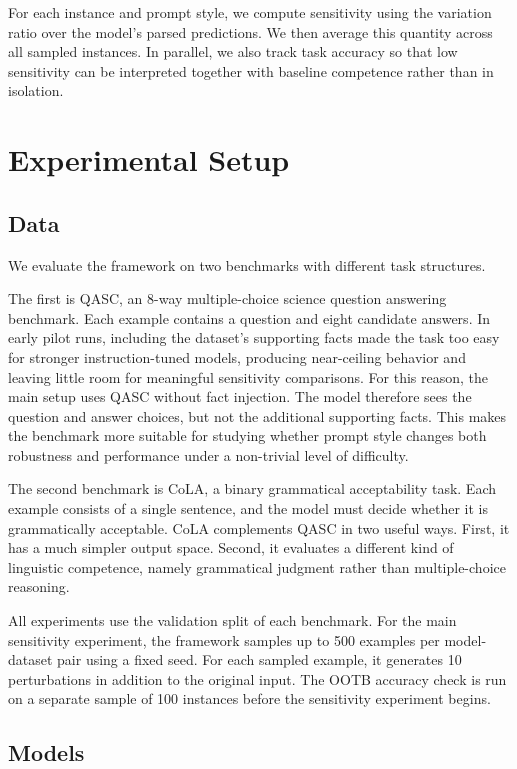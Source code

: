 \documentclass[11pt]{article}
\begin{document}
For each instance and prompt style, we compute sensitivity using the variation ratio over the model's parsed predictions. We then average this quantity across all sampled instances. In parallel, we also track task accuracy so that low sensitivity can be interpreted together with baseline competence rather than in isolation.

\section{Experimental Setup}

\subsection{Data}

We evaluate the framework on two benchmarks with different task structures.

The first is QASC, an 8-way multiple-choice science question answering benchmark. Each example contains a question and eight candidate answers. In early pilot runs, including the dataset's supporting facts made the task too easy for stronger instruction-tuned models, producing near-ceiling behavior and leaving little room for meaningful sensitivity comparisons. For this reason, the main setup uses QASC without fact injection. The model therefore sees the question and answer choices, but not the additional supporting facts. This makes the benchmark more suitable for studying whether prompt style changes both robustness and performance under a non-trivial level of difficulty.

The second benchmark is CoLA, a binary grammatical acceptability task. Each example consists of a single sentence, and the model must decide whether it is grammatically acceptable. CoLA complements QASC in two useful ways. First, it has a much simpler output space. Second, it evaluates a different kind of linguistic competence, namely grammatical judgment rather than multiple-choice reasoning.

All experiments use the validation split of each benchmark. For the main sensitivity experiment, the framework samples up to 500 examples per model-dataset pair using a fixed seed. For each sampled example, it generates 10 perturbations in addition to the original input. The OOTB accuracy check is run on a separate sample of 100 instances before the sensitivity experiment begins.

\subsection{Models}
\end{document}
